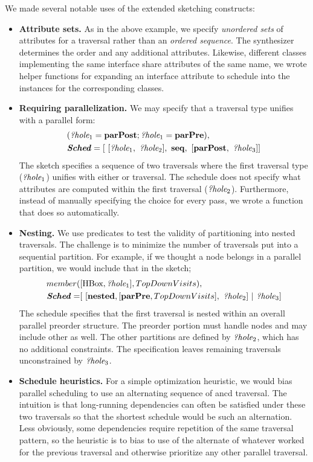 We made several notable uses of the extended sketching constructs:
\begin{itemize}
\item \textbf{Attribute sets.} As in the above example, we specify \emph{unordered sets} of attributes for a traversal rather than an \emph{ordered sequence}. The synthesizer determines the order and any additional attributes. Likewise, different classes implementing the same interface share attributes of the same name, we wrote helper functions for expanding an interface attribute to schedule into the instances for the corresponding classes.
\item \textbf{Requiring parallelization.} We may specify that a traversal type unifies with a parallel form:
\begin{align*}
& ({\emph{?hole}}_1 = \text{\textbf{parPost}} ; {\emph{?hole}}_1 =  \text{\textbf{parPre}}), \\
& \textbf{\emph{Sched}} = [~[{\emph{?hole}}_1, ~ {\emph{?hole}}_2], ~ \text{\textbf{seq}}, ~ [\text{\textbf{parPost}}, ~{\emph{?hole}}_3]]
\end{align*}
The sketch specifies a sequence of two traversals where the first traversal type (${\emph{?hole}}_1$) unifies with either   or  traversal. The schedule does not specify what attributes are computed within the first traversal (${\emph{?hole}}_2$). Furthermore, instead of manually specifying the choice for every pass, we wrote a function that does so automatically.
\item \textbf{Nesting.} We use predicates to test the validity of partitioning into nested traversals. The challenge is to minimize the number of traversals put into a sequential partition. For example, if we thought a node belongs in a parallel partition, we would include that in the sketch;
\begin{align*}
member(&[\text{HBox}, {\emph{?hole}}_1], TopDownVisits),\\
\textbf{\emph{Sched}}  =& [ ~ [\text{\textbf{nested}},  [\text{\textbf{parPre}}, TopDownVisits], ~{\emph{?hole}}_2] ~ | ~ {\emph{?hole}}_3]
\end{align*}
The schedule specifies that the first traversal is nested within an overall parallel preorder structure. The preorder portion must handle  nodes and may include other as well. The other partitions are defined by ${\emph{?hole}}_2$, which has no additional constraints. The specification leaves remaining traversals unconstrained by ${\emph{?hole}}_3$.
\item \textbf{Schedule heuristics.} For a simple optimization heuristic, we would bias parallel scheduling to use an alternating sequence of  ancd  traversal. The intuition is that long-running dependencies can often be satisfied under these two traversals so that the shortest schedule would be such an alternation. Less obviously, some dependencies require repetition of the same traversal pattern, so the heuristic is to bias to use of the alternate of whatever worked for the previous traversal and otherwise prioritize any other parallel traversal.
\end{itemize}

